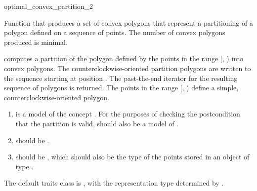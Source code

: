 \begin{ccRefFunction}{optimal_convex_partition_2}

Function that produces a set of convex polygons 
that represent a partitioning of a polygon defined on a sequence of 
points. 
The number of convex polygons produced is minimal.


{
computes a partition of the polygon defined
by the points in the range [, ) into convex
polygons. The counterclockwise-oriented partition polygons are written to
the sequence starting at position .  The past-the-end iterator for
the resulting sequence of polygons is returned.
\ccPrecond The points in the range [, ) define a
simple, counterclockwise-oriented polygon.
}

\begin{enumerate}
    \item {} is a model of the concept %
          .
          For the purposes of checking the
          postcondition that the partition is valid,  should
          also be a model of .
    \item {} should be
          .
    \item {} should be ,
          which should also be the type of the points stored in an object
          of type .
\end{enumerate}

The default traits class  is ,
with the representation type determined by .

\ccSeeAlso
{} \\
 \\
 \\
 \\



\end{ccRefFunction}
